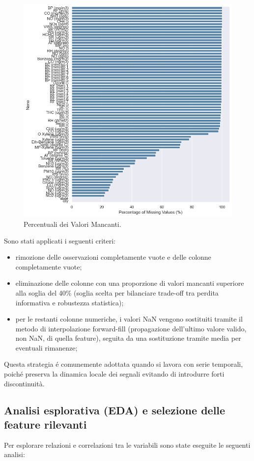 \documentclass[a4paper,12pt]{report}
\begin{document}
	\begin{figure}[H]
		\centering
		\includegraphics[width=1.0\textwidth]{img/miss_value_pm.png}
		\caption{Percentuali dei Valori Mancanti.}
	\end{figure}
	
	Sono stati applicati i seguenti criteri:
	\begin{itemize}
		\item rimozione delle osservazioni completamente vuote e delle colonne completamente vuote;
		\item eliminazione delle colonne con una proporzione di valori mancanti superiore alla soglia del 40\% (soglia scelta per bilanciare trade-off tra perdita informativa e robustezza statistica);
		\item per le restanti colonne numeriche, i valori NaN vengono sostituiti tramite il metodo di interpolazione forward-fill (propagazione dell'ultimo valore valido, non NaN, di quella feature), seguita da una sostituzione tramite media per eventuali rimanenze;
	\end{itemize}
	
	Questa strategia é comunemente adottata quando si lavora con serie temporali, poiché preserva la dinamica locale dei segnali evitando di introdurre forti discontinuità.
	
	\subsection{Analisi esplorativa (EDA) e selezione delle feature rilevanti}
	Per esplorare relazioni e correlazioni tra le variabili sono state eseguite le seguenti analisi:
	
\end{document}
